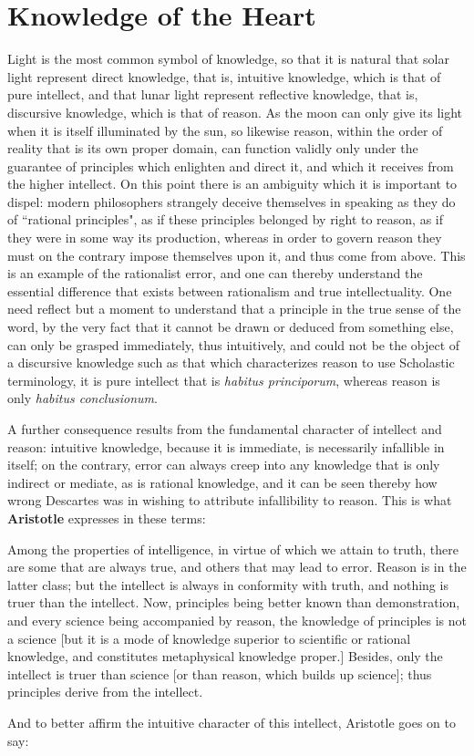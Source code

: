 \section{Knowledge of the Heart}

Light is the most common symbol of knowledge, so that it is natural that solar light represent direct knowledge, that is, intuitive knowledge, which is that of pure intellect, and that lunar light represent reflective knowledge, that is, discursive knowledge, which is that of reason. As the moon can only give its light when it is itself illuminated by the sun, so likewise reason, within the order of reality that is its own proper domain, can function validly only under the guarantee of principles which enlighten and direct it, and which it receives from the higher intellect. On this point there is an ambiguity which it is important to dispel: modern philosophers strangely deceive themselves in speaking as they do of ``rational principles", as if these principles belonged by right to reason, as if they were in some way its production, whereas in order to govern reason they must on the contrary impose themselves upon it, and thus come from above. This is an example of the rationalist error, and one can thereby understand the essential difference that exists between rationalism and true intellectuality. One need reflect but a moment to understand that a principle in the true sense of the word, by the very fact that it cannot be drawn or deduced from something else, can only be grasped immediately, thus intuitively, and could not be the object of a discursive knowledge such as that which characterizes reason to use Scholastic terminology, it is pure intellect that is \emph{habitus principorum}, whereas reason is only \emph{habitus conclusionum}.

A further consequence results from the fundamental character of intellect and reason: intuitive knowledge, because it is immediate, is necessarily infallible in itself; on the contrary, error can always creep into any knowledge that is only indirect or mediate, as is rational knowledge, and it can be seen thereby how wrong Descartes was in wishing to attribute infallibility to reason. This is what \textbf{Aristotle} expresses in these terms:

\begin{quotex}
Among the properties of intelligence, in virtue of which we attain to truth, there are some that are always true, and others that may lead to error. Reason is in the latter class; but the intellect is always in conformity with truth, and nothing is truer than the intellect. Now, principles being better known than demonstration, and every science being accompanied by reason, the knowledge of principles is not a science [but it is a mode of knowledge superior to scientific or rational knowledge, and constitutes metaphysical knowledge proper.] Besides, only the intellect is truer than science [or than reason, which builds up science]; thus principles derive from the intellect. 

\end{quotex}
And to better affirm the intuitive character of this intellect, Aristotle goes on to say:


